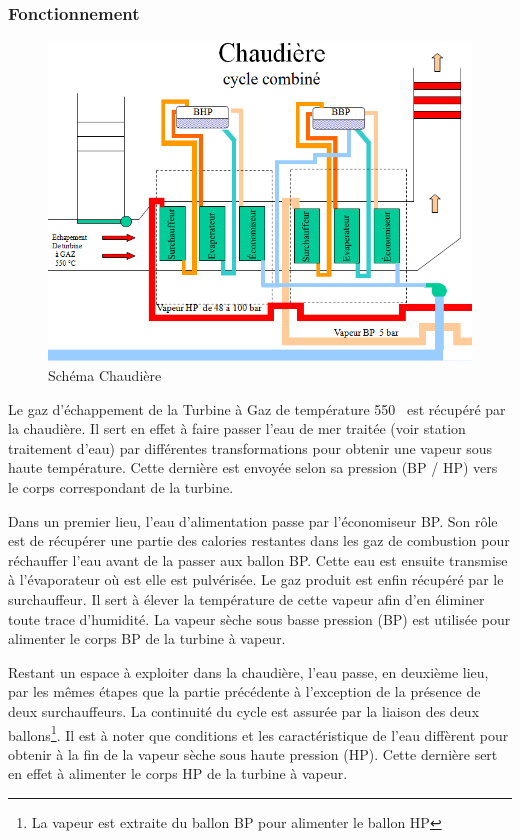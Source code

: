 \subsubsection{Fonctionnement}
\begin{figure}[hbtp]
\centering
\includegraphics[scale=0.7]{./Figures/chaudiere_fonctionnement.png}
\caption{Schéma Chaudière }
\end{figure}
Le gaz d'échappement de la Turbine à Gaz de température 550 \textcelsius\ est récupéré par la chaudière. Il sert en effet à faire passer l'eau de mer traitée (voir station traitement d'eau) par différentes transformations pour obtenir une vapeur sous haute température. Cette dernière est envoyée selon sa pression (BP / HP) vers le corps correspondant de la turbine.

Dans un premier lieu, l'eau d'alimentation passe par l'économiseur BP. Son rôle est de récupérer une partie des calories restantes dans les gaz de combustion pour réchauffer l'eau avant de la passer aux ballon BP. Cette eau est ensuite transmise à l'évaporateur où est elle est pulvérisée. Le gaz produit est enfin récupéré par le surchauffeur. Il sert à élever la température de cette vapeur   afin d'en éliminer toute trace d'humidité. La vapeur sèche sous basse pression (BP) est utilisée pour alimenter le corps BP de la turbine à vapeur.

Restant un  espace à exploiter dans la chaudière, l'eau passe, en deuxième lieu, par les mêmes étapes  que la partie précédente à l'exception de la présence de deux surchauffeurs. La continuité du cycle est assurée par la liaison des deux ballons\footnote{La vapeur est extraite du ballon BP pour alimenter le ballon HP}. Il est  à noter que conditions et les caractéristique de l'eau diffèrent pour obtenir à la fin de la vapeur sèche sous haute pression (HP). Cette dernière sert en effet à alimenter le corps HP de la turbine à vapeur.
